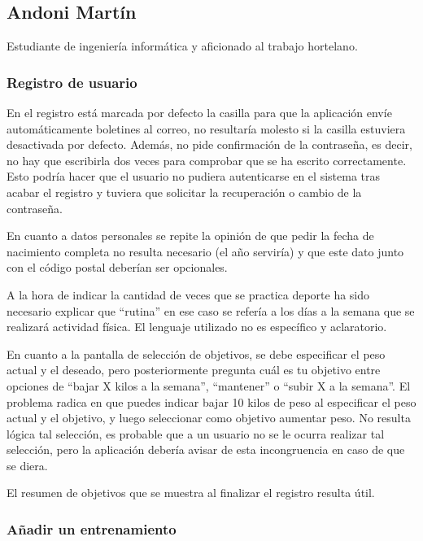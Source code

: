 \documentclass[a4paper]{article}
\begin{document}
		\subsection{Andoni Martín}
		
			Estudiante de ingeniería informática y aficionado al trabajo hortelano.
		
			\subsubsection*{Registro de usuario}
			
			En el registro está marcada por defecto la casilla para que la aplicación envíe automáticamente boletines al correo, no resultaría molesto si la casilla estuviera desactivada por defecto. Además, no pide confirmación de la contraseña, es decir, no hay que escribirla dos veces para comprobar que se ha escrito correctamente. Esto podría hacer que el usuario no pudiera autenticarse en el sistema tras acabar el registro y tuviera que solicitar la recuperación o cambio de la contraseña.
			
			En cuanto a datos personales se repite la opinión de que pedir la fecha de nacimiento completa no resulta necesario (el año serviría) y que este dato junto con el código postal deberían ser opcionales.
			
			A la hora de indicar la cantidad de veces que se practica deporte ha sido necesario explicar que ``rutina'' en ese caso se refería a los días a la semana que se realizará actividad física. El lenguaje utilizado no es específico y aclaratorio.
			
			En cuanto a la pantalla de selección de objetivos, se debe especificar el peso actual y el deseado, pero posteriormente pregunta cuál es tu objetivo entre opciones de ``bajar X kilos a la semana'', ``mantener'' o ``subir X a la semana''. El problema radica en que puedes indicar bajar 10 kilos de peso al especificar el peso actual y el objetivo, y luego seleccionar como objetivo aumentar peso. No resulta lógica tal selección, es probable que a un usuario no se le ocurra realizar tal selección, pero la aplicación debería avisar de esta incongruencia en caso de que se diera.
			
			El resumen de objetivos que se muestra al finalizar el registro resulta útil.
			
			\subsubsection*{Añadir un entrenamiento}
			
\end{document}
